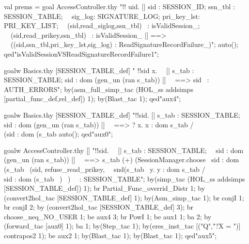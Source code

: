 \documentclass[a4paper,pdftex]{article}
\newenvironment{holz-proof}{\comment}{\endcomment}
\begin{document}
\begin{holz-proof}
val prems = goal AccessController.thy 
"!! uid. [| sid : SESSION_ID; ssn_tbl : SESSION_TABLE;                 \
\           sig_log: SIGNATURE_LOG; pri_key_lst: PRI_KEY_LIST;         \
\           (sid,read_siglog,ssn_tbl) ~: isValidSession_;              \
\           (sid,read_prikey,ssn_tbl) ~: isValidSession_ |] ==>        \
\   ((sid,ssn_tbl,pri_key_lst,sig_log) : ReadSignatureRecordFailure_)";
auto();
qed"isValidSessionVSReadSignatureRecordFailure1";




goalw Basics.thy [SESSION_TABLE_def]
" !!sid x.                                                             \              
\      [| s_tab : SESSION_TABLE; sid : dom (gen_un (ran s_tab)) |]     \
\      ==> sid ~: AUTH_ERRORS";
by(asm_full_simp_tac (HOL_ss addsimps [partial_func_def,rel_def]) 1);
by(Blast_tac 1);
qed"aux4";


goalw Basics.thy [SESSION_TABLE_def]
"!!sid. [| s_tab : SESSION_TABLE; sid : dom (gen_un (ran s_tab)) |]    \
\       ==>  ? x. x : dom s_tab /\\  (sid : dom (s_tab %
auto();
qed"aux0";    



goalw AccessController.thy []
"!!sid.                                                                  \
\       [| s_tab : SESSION_TABLE;                                        \
\          sid : dom (gen_un (ran s_tab)) |]                             \
\      ==> s_tab (+) {(SessionManager.choose %
\                                    sid : dom (s_tab %
\                      {(sid, refuse_read_prikey,                        \
\                        snd(s_tab %
\                            {y. y : dom s_tab /\\ sid : dom (s_tab %
\                            }) %
\                      })}                                               \
\           : SESSION_TABLE";
by(simp_tac (HOL_ss addsimps [SESSION_TABLE_def]) 1);
br Partial_Func_overrid_Distr 1;
by (convert2hol_tac [SESSION_TABLE_def] 1); 
by(Asm_simp_tac 1);
br conjI 1; br conjI 2;
by (convert2hol_tac [SESSION_TABLE_def] 3); 
br choose_neq_NO_USER 1;
be aux4 3;
br PowI 1;
be aux1 1; ba 2;
by (forward_tac [aux0] 1); ba 1;
by(Step_tac 1);
by(eres_inst_tac [("Q","?X = {}")] contrapos2 1);
be aux2 1;
by(Blast_tac 1);
by(Blast_tac 1);
qed"aux5";




\end{holz-proof}
\end{document}
